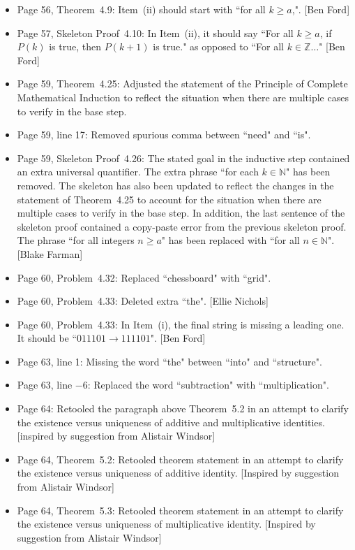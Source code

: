 \documentclass[11pt]{article}%
\begin{document}
\begin{itemize}
\item Page 56, Theorem~4.9: Item~(ii) should start with ``for all $k\geq a$,". [Ben Ford]
\item Page 57, Skeleton Proof~4.10: In Item~(ii), it should say ``For all $k\geq a$, if $P(k)$ is true, then $P(k+1)$ is true." as opposed to ``For all $k\in\mathbb{Z}\ldots$" [Ben Ford]
\item Page 59, Theorem~4.25: Adjusted the statement of the Principle of Complete Mathematical Induction to reflect the situation when there are multiple cases to verify in the base step.
\item Page 59, line 17: Removed spurious comma between ``need" and ``is".
\item Page 59, Skeleton Proof~4.26: The stated goal in the inductive step contained an extra universal quantifier.  The extra phrase ``for each $k \in \mathbb{N}$" has been removed.  The skeleton has also been updated to reflect the changes in the statement of Theorem~4.25 to account for the situation when there are multiple cases to verify in the base step. In addition, the last sentence of the skeleton proof contained a copy-paste error from the previous skeleton proof.  The phrase ``for all integers $n \ge a$" has been replaced with ``for all $n\in\mathbb{N}$". [Blake Farman]
\item Page 60, Problem~4.32: Replaced ``chessboard" with ``grid".
\item Page 60, Problem~4.33: Deleted extra ``the". [Ellie Nichols]
\item Page 60, Problem~4.33: In Item~(i), the final string is missing a leading one.  It should be ``$011101 \to 111101$". [Ben Ford]
\item Page 63, line 1: Missing the word ``the" between ``into" and ``structure".
\item Page 63, line $-6$: Replaced the word ``subtraction" with ``multiplication". 
\item Page 64: Retooled the paragraph above Theorem~5.2 in an attempt to clarify the existence versus uniqueness of additive and multiplicative identities. [inspired by suggestion from Alistair Windsor]
\item Page 64, Theorem~5.2: Retooled theorem statement in an attempt to clarify the existence versus uniqueness of additive identity. [Inspired by suggestion from Alistair Windsor]
\item Page 64, Theorem~5.3: Retooled theorem statement in an attempt to clarify the existence versus uniqueness of multiplicative identity. [Inspired by suggestion from Alistair Windsor]

\end{itemize}
\end{document}
